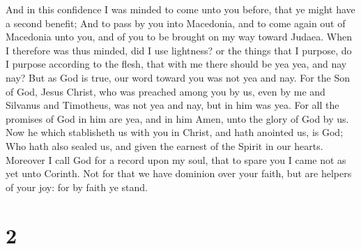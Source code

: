  And in this confidence I was minded to come unto you
before, that ye might have a second benefit;  And to pass
by you into Macedonia, and to come again out of Macedonia unto you, and
of you to be brought on my way toward Judaea.  When I
therefore was thus minded, did I use lightness? or the things that I
purpose, do I purpose according to the flesh, that with me there should
be yea yea, and nay nay?  But as God is true, our word
toward you was not yea and nay.  For the Son of God,
Jesus Christ, who was preached among you by us, even by me and Silvanus
and Timotheus, was not yea and nay, but in him was yea. 
For all the promises of God in him are yea, and in him Amen, unto the
glory of God by us.  Now he which stablisheth us with you
in Christ, and hath anointed us, is God;  Who hath also
sealed us, and given the earnest of the Spirit in our hearts.
 Moreover I call God for a record upon my soul, that to
spare you I came not as yet unto Corinth.  Not for that
we have dominion over your faith, but are helpers of your joy: for by
faith ye stand.

\hypertarget{section-1}{%
\section{2}\label{section-1}}

